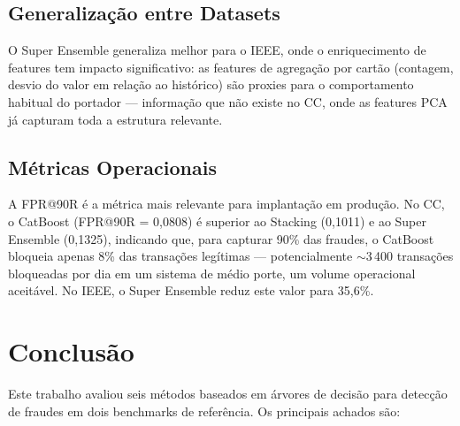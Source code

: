 \documentclass[12pt,a4paper]{article}
\begin{document}
\subsection{Generalização entre Datasets}

O Super Ensemble generaliza melhor para o IEEE, onde o enriquecimento de
features tem impacto significativo: as features de agregação por cartão
(contagem, desvio do valor em relação ao histórico) são proxies para o
comportamento habitual do portador — informação que não existe no CC, onde as
features PCA já capturam toda a estrutura relevante.

\subsection{Métricas Operacionais}

A FPR@90R é a métrica mais relevante para implantação em produção. No CC, o
CatBoost (FPR@90R = 0{,}0808) é superior ao Stacking (0{,}1011) e ao Super
Ensemble (0{,}1325), indicando que, para capturar 90\% das fraudes, o CatBoost
bloqueia apenas 8\% das transações legítimas — potencialmente $\sim$3\,400
transações bloqueadas por dia em um sistema de médio porte, um volume operacional
aceitável. No IEEE, o Super Ensemble reduz este valor para 35{,}6\%.

\section{Conclusão}
\label{sec:conclusao}

Este trabalho avaliou seis métodos baseados em árvores de decisão para detecção
de fraudes em dois benchmarks de referência. Os principais achados são:
\end{document}
